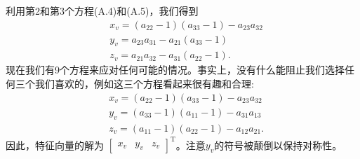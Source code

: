 利用第2和第3个方程(A.4)和(A.5)，我们得到
$$
\begin{aligned}
& x_{v}=\left(a_{22}-1\right)\left(a_{33}-1\right)-a_{23} a_{32} \\
& y_{v}=a_{23} a_{31}-a_{21}\left(a_{33}-1\right) \\
& z_{v}=a_{21} a_{32}-a_{31}\left(a_{22}-1\right) .
\end{aligned}
$$
现在我们有9个方程来应对任何可能的情况。事实上，没有什么能阻止我们选择任何三个我们喜欢的，例如这三个方程看起来很有趣和合理:
\begin{align}
& x_{v}=\left(a_{22}-1\right)\left(a_{33}-1\right)-a_{23} a_{32} \\
& y_{v}=\left(a_{33}-1\right)\left(a_{11}-1\right)-a_{31} a_{13} \\
& z_{v}=\left(a_{11}-1\right)\left(a_{22}-1\right)-a_{12} a_{21} .
\end{align}
因此，特征向量的解为 $\left[\begin{array}{lll}x_{v} & y_{v} & z_{v}\end{array}\right]^{\mathrm{T}}$。注意$y_{v}$的符号被颠倒以保持对称性。

